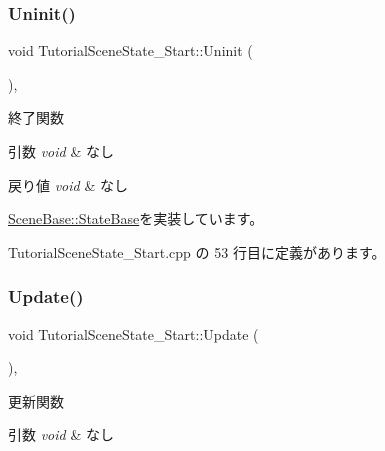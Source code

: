 \subsubsection{\texorpdfstring{Uninit()}{Uninit()}}
{\footnotesize\ttfamily void Tutorial\+Scene\+State\+\_\+\+Start\+::\+Uninit (\begin{DoxyParamCaption}{ }\end{DoxyParamCaption})\hspace{0.3cm}{\ttfamily [override]}, {\ttfamily [virtual]}}



終了関数 


\begin{DoxyParams}{引数}
{\em void} & なし \\
\hline
\end{DoxyParams}

\begin{DoxyRetVals}{戻り値}
{\em void} & なし \\
\hline
\end{DoxyRetVals}


\mbox{\hyperlink{class_scene_base_1_1_state_base_a2763fa37e45b39bd8d3bbb735c76c59b}{Scene\+Base\+::\+State\+Base}}を実装しています。



 Tutorial\+Scene\+State\+\_\+\+Start.\+cpp の 53 行目に定義があります。

\mbox{\label{class_tutorial_scene_state___start_a93c322692bf56172f383d3e5b17cd85c}} 
\subsubsection{\texorpdfstring{Update()}{Update()}}
{\footnotesize\ttfamily void Tutorial\+Scene\+State\+\_\+\+Start\+::\+Update (\begin{DoxyParamCaption}{ }\end{DoxyParamCaption})\hspace{0.3cm}{\ttfamily [override]}, {\ttfamily [virtual]}}



更新関数 


\begin{DoxyParams}{引数}
{\em void} & なし \\
\hline
\end{DoxyParams}

